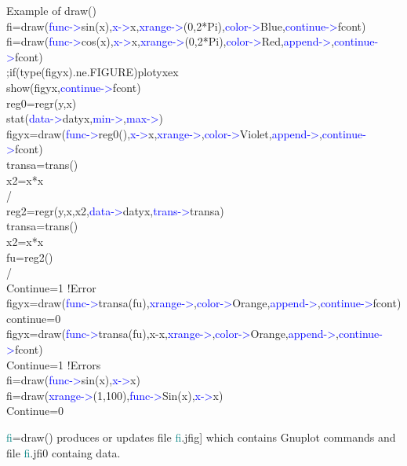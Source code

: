 \begin{example}[drawex]Example of \textcolor{VioletRed}{draw}()\\
\label{drawex}
fi=\textcolor{VioletRed}{draw}(\textcolor{blue}{func->}\textcolor{VioletRed}{sin}(x),\textcolor{blue}{x->}x,\textcolor{blue}{xrange->}(0,2*Pi),\textcolor{blue}{color->}Blue,\textcolor{blue}{continue->}fcont)\\
fi=\textcolor{VioletRed}{draw}(\textcolor{blue}{func->}\textcolor{VioletRed}{cos}(x),\textcolor{blue}{x->}x,\textcolor{blue}{xrange->}(0,2*Pi),\textcolor{blue}{color->}Red,\textcolor{blue}{append->},\textcolor{blue}{continue->}fcont)\\
;if(\textcolor{VioletRed}{type}(figyx).ne.FIGURE)plotyxex\\
\textcolor{VioletRed}{show}(figyx,\textcolor{blue}{continue->}fcont)\\
reg0=\textcolor{VioletRed}{regr}(y,x)\\
\textcolor{VioletRed}{stat}(\textcolor{blue}{data->}datyx,\textcolor{blue}{min->},\textcolor{blue}{max->})\\
figyx=\textcolor{VioletRed}{draw}(\textcolor{blue}{func->}reg0(),\textcolor{blue}{x->}x,\textcolor{blue}{xrange->},\textcolor{blue}{color->}Violet,\textcolor{blue}{append->},\textcolor{blue}{continue->}fcont)\\
transa=\textcolor{VioletRed}{trans}()\\
x2=x*x\\
/\\
reg2=\textcolor{VioletRed}{regr}(y,x,x2,\textcolor{blue}{data->}datyx,\textcolor{blue}{trans->}transa)\\
transa=\textcolor{VioletRed}{trans}()\\
x2=x*x\\
fu=reg2()\\
/\\
Continue=1  !Error\\
figyx=\textcolor{VioletRed}{draw}(\textcolor{blue}{func->}transa(fu),\textcolor{blue}{xrange->},\textcolor{blue}{color->}Orange,\textcolor{blue}{append->},\textcolor{blue}{continue->}fcont)\\
continue=0\\
figyx=\textcolor{VioletRed}{draw}(\textcolor{blue}{func->}transa(fu),x-x,\textcolor{blue}{xrange->},\textcolor{blue}{color->}Orange,\textcolor{blue}{append->},\textcolor{blue}{continue->}fcont)\\
Continue=1  !Errors\\
fi=\textcolor{VioletRed}{draw}(\textcolor{blue}{func->}\textcolor{VioletRed}{sin}(x),\textcolor{blue}{x->}x)\\
fi=\textcolor{VioletRed}{draw}(\textcolor{blue}{xrange->}(1,100),\textcolor{blue}{func->}Sin(x),\textcolor{blue}{x->}x)\\
Continue=0
\end{example}
\begin{note}
\textcolor{teal}{fi}=\textcolor{VioletRed}{draw}() produces or updates file \textcolor{teal}{fi}.jfig] which contains
Gnuplot commands and file \textcolor{teal}{fi}.jfi0 containg data.
\end{note}
